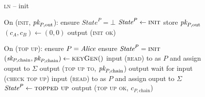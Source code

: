 \begin{figure}[H]
  \begin{processbox}{\textsc{ln} -- init}
    \begin{algorithmic}[1]
      \State {}
      \State {}
      \State On (\textsc{init}, $\textit{pk}_{P, \mathrm{out}}$):
      \Indent
        \State ensure $\textit{State}^P = \bot$
        \State $\textit{State}^P \gets \textsc{init}$
        \State store $\textit{pk}_{P, \mathrm{out}}$
        \State $(c_A, c_B) \gets (0, 0)$
        \State output (\textsc{init ok})
      \EndIndent
      \Statex

      \State On (\textsc{top up}):
      \Indent
        \State ensure $P = \mathit{Alice}$ 
        \State ensure $\textit{State}^P = \textsc{init}$
        \State $(\textit{sk}_{P, \mathrm{chain}}, \textit{pk}_{P, \mathrm{chain}}) \gets
        \textsc{keyGen}()$
        \State input (\textsc{read}) to \ledger as $P$ and assign ouput to
        $\Sigma$
        \State output (\textsc{top up to}, $\textit{pk}_{P, \mathrm{chain}}$)
          \State output
          \State {}
          \State wait for input (\textsc{check top up})
          \State input (\textsc{read}) to \ledger as $P$ and assign ouput to
          $\Sigma$
        \EndWhile
        \State $\textit{State}^P \gets \textsc{topped up}$
        \State output (\textsc{top up ok}, $c_{P, \mathrm{chain}}$)
      \EndIndent
    \end{algorithmic}
  \end{processbox}
  \caption{}
  \label{code:ln:init}
\end{figure}

